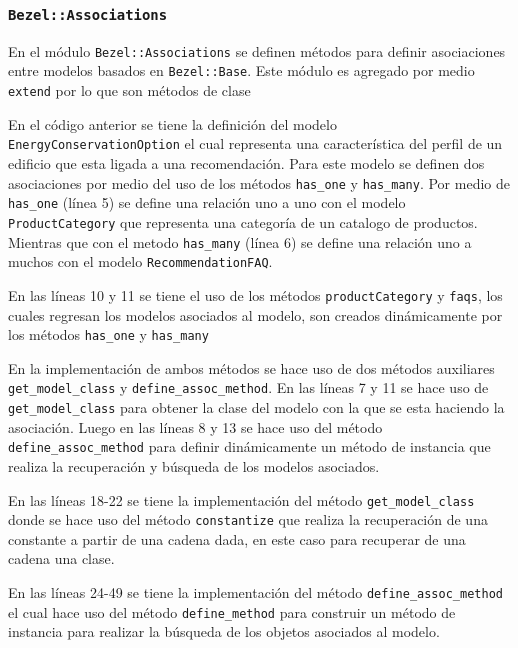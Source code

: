 \subsubsection{\texttt{Bezel::Associations}}

En el módulo \texttt{Bezel::Associations} se definen métodos para definir
asociaciones entre modelos basados en \texttt{Bezel::Base}. Este módulo
es agregado por medio \texttt{extend} por lo que son métodos de clase



En el código anterior se tiene la definición del modelo
\texttt{EnergyConservationOption} el cual representa una característica del perfil
de un edificio que esta ligada a una recomendación. Para este modelo se definen
dos asociaciones por medio del uso de los métodos \texttt{has\_one} y
\texttt{has\_many}. Por medio de \texttt{has\_one} (línea 5) se define una relación
uno a uno con el modelo \texttt{ProductCategory} que representa una categoría de un
catalogo de productos. Mientras que con el metodo \texttt{has\_many} (línea 6) se
define una relación uno a muchos con el modelo \texttt{RecommendationFAQ}.

En las líneas 10 y 11 se tiene el uso de los métodos \texttt{productCategory} y
\texttt{faqs}, los cuales regresan los modelos asociados al modelo, son creados
dinámicamente por los métodos \texttt{has\_one} y \texttt{has\_many}



En la implementación de ambos métodos se hace uso de dos métodos auxiliares
\texttt{get\_model\_class} y \texttt{define\_assoc\_method}.
En las líneas 7 y 11 se hace uso de \texttt{get\_model\_class} para obtener
la clase del modelo con la que se esta haciendo la asociación. Luego en las
líneas 8 y 13 se hace uso del método \texttt{define\_assoc\_method} para
definir dinámicamente un método de instancia que realiza la recuperación
y búsqueda de los modelos asociados.

En las líneas 18-22 se tiene la implementación del método \texttt{get\_model\_class}
donde se hace uso del método \texttt{constantize} que realiza la recuperación
de una constante a partir de una cadena dada, en este caso para recuperar de
una cadena una clase.

En las líneas 24-49 se tiene la implementación del método
\texttt{define\_assoc\_method} el cual hace uso del método \texttt{define\_method}
para construir un método de instancia para realizar la búsqueda de los objetos
asociados al modelo.


